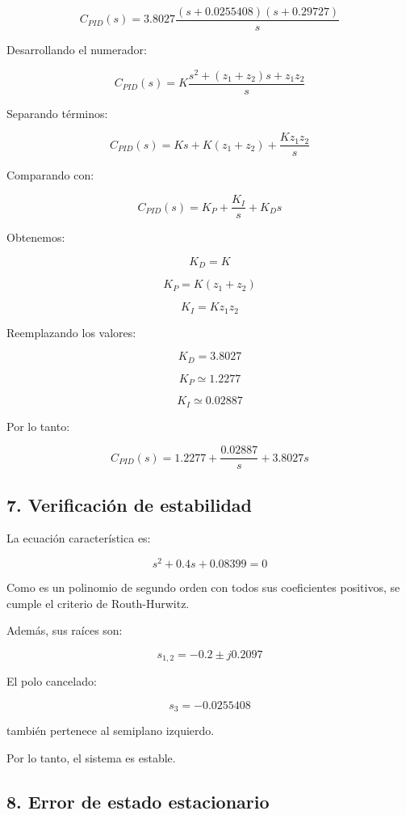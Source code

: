 \documentclass[10pt]{article}
\begin{document}
\[
C_{PID}(s)=
3.8027
\frac{
(s+0.0255408)(s+0.29727)
}{s}
\]

Desarrollando el numerador:

\[
C_{PID}(s)=
K\frac{
s^2+(z_1+z_2)s+z_1z_2
}{s}
\]

Separando términos:

\[
C_{PID}(s)=
Ks+K(z_1+z_2)+\frac{Kz_1z_2}{s}
\]

Comparando con:

\[
C_{PID}(s)=K_P+\frac{K_I}{s}+K_Ds
\]

Obtenemos:

\[
K_D=K
\]

\[
K_P=K(z_1+z_2)
\]

\[
K_I=Kz_1z_2
\]

Reemplazando los valores:

\begin{equation}
\boxed{K_D=3.8027}
\end{equation}

\begin{equation}
\boxed{K_P\simeq1.2277}
\end{equation}

\begin{equation}
\boxed{K_I\simeq0.02887}
\end{equation}

Por lo tanto:

\begin{equation}
\boxed{
C_{PID}(s)=
1.2277+\frac{0.02887}{s}+3.8027s
}
\end{equation}

\subsection*{7. Verificación de estabilidad}

La ecuación característica es:

\[
s^2+0.4s+0.08399=0
\]

Como es un polinomio de segundo orden
con todos sus coeficientes positivos,
se cumple el criterio de Routh-Hurwitz.

Además, sus raíces son:

\[
s_{1,2}=-0.2\pm j0.2097
\]

El polo cancelado:

\[
s_3=-0.0255408
\]

también pertenece al semiplano izquierdo.

Por lo tanto, el sistema es estable.

\subsection*{8. Error de estado estacionario}
\end{document}
